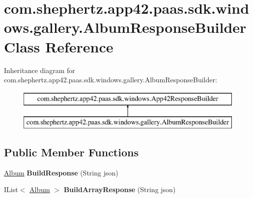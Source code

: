 \hypertarget{classcom_1_1shephertz_1_1app42_1_1paas_1_1sdk_1_1windows_1_1gallery_1_1_album_response_builder}{\section{com.\+shephertz.\+app42.\+paas.\+sdk.\+windows.\+gallery.\+Album\+Response\+Builder Class Reference}
\label{classcom_1_1shephertz_1_1app42_1_1paas_1_1sdk_1_1windows_1_1gallery_1_1_album_response_builder}
}
Inheritance diagram for com.\+shephertz.\+app42.\+paas.\+sdk.\+windows.\+gallery.\+Album\+Response\+Builder\+:\begin{figure}[H]
\begin{center}
\leavevmode
\includegraphics[height=2.000000cm]{classcom_1_1shephertz_1_1app42_1_1paas_1_1sdk_1_1windows_1_1gallery_1_1_album_response_builder}
\end{center}
\end{figure}
\subsection*{Public Member Functions}
\begin{DoxyCompactItemize}
\item 
\hypertarget{classcom_1_1shephertz_1_1app42_1_1paas_1_1sdk_1_1windows_1_1gallery_1_1_album_response_builder_ad915bee37e16ca6cc5125f9bf8598133}{\hyperlink{classcom_1_1shephertz_1_1app42_1_1paas_1_1sdk_1_1windows_1_1gallery_1_1_album}{Album} {\bfseries Build\+Response} (String json)}\label{classcom_1_1shephertz_1_1app42_1_1paas_1_1sdk_1_1windows_1_1gallery_1_1_album_response_builder_ad915bee37e16ca6cc5125f9bf8598133}

\item 
\hypertarget{classcom_1_1shephertz_1_1app42_1_1paas_1_1sdk_1_1windows_1_1gallery_1_1_album_response_builder_a86ae1a33acce3bb6bc713388b7b58d63}{I\+List$<$ \hyperlink{classcom_1_1shephertz_1_1app42_1_1paas_1_1sdk_1_1windows_1_1gallery_1_1_album}{Album} $>$ {\bfseries Build\+Array\+Response} (String json)}\label{classcom_1_1shephertz_1_1app42_1_1paas_1_1sdk_1_1windows_1_1gallery_1_1_album_response_builder_a86ae1a33acce3bb6bc713388b7b58d63}

\end{DoxyCompactItemize}
